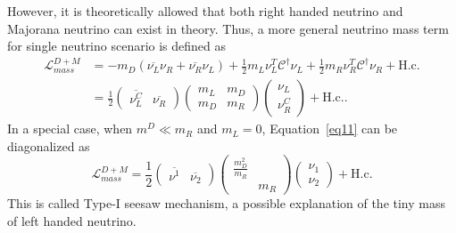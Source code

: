     However, it is theoretically allowed that both right handed neutrino and Majorana neutrino can exist in theory. 
    Thus, a more general neutrino mass term for single neutrino scenario is defined as 
    \begin{equation}
    \label{eq11}
    \begin{aligned}
    \mathscr{L}_{mass}^{D+M} &= - m_D(\overline{\nu_{L}}\nu_{R} + \overline{\nu_{R}}\nu_{L}) + \frac{1}{2}m_L{\nu_{L}^T} \mathcal{C}^\dagger \nu_{L} + \frac{1}{2}m_R{\nu_{R}^T} \mathcal{C}^\dagger \nu_{R} + \textrm{H.c.} \\
    & = \frac{1}{2}(\begin{array}{cc}
    \overline{\nu^C_L} & \overline{\nu_R} \end{array}) 
    \left(\begin{array}{cc}
    m_L & m_D \\
    m_D & m_R
    \end{array}\right)
    \left(\begin{array}{c}
    \nu_L \\
    \nu_R^C
    \end{array}\right) + \textrm{H.c.}.
    \end{aligned}
    \end{equation}
    In a special case, when $m^D \ll m_R$ and $m_L = 0$, Equation~\ref{eq11} can be diagonalized as
    \begin{equation}
    \label{eq12}
    \mathscr{L}_{mass}^{D+M}  = \frac{1}{2}(\begin{array}{cc}
    \overline{\nu^1} & \overline{\nu_2} \end{array}) 
    \left(\begin{array}{cc}
    \frac{m_D^2}{m_R} &  \\
     & m_R
    \end{array}\right)
    \left(\begin{array}{c}
    \nu_1 \\
    \nu_2
    \end{array}\right) + \textrm{H.c.}
    \end{equation}
    This is called Type-I seesaw mechanism, a possible explanation of the tiny mass of left handed neutrino.

    
